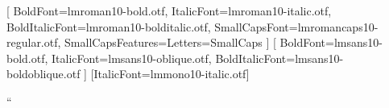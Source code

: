 
\usepackage{eurosym}
\usepackage{iftex}
\ifpdftex
  \usepackage[T1]{fontenc}
  \usepackage[utf8]{inputenc}
  \usepackage{lmodern}
\else
  \usepackage{fontspec}
  \setmainfont{lmroman10-regular.otf}[
    BoldFont=lmroman10-bold.otf,
    ItalicFont=lmroman10-italic.otf,
    BoldItalicFont=lmroman10-bolditalic.otf,
    SmallCapsFont=lmromancaps10-regular.otf,
    SmallCapsFeatures={Letters=SmallCaps}
  ]
  \setsansfont{lmsans10-regular.otf}[
    BoldFont=lmsans10-bold.otf,
    ItalicFont=lmsans10-oblique.otf,
    BoldItalicFont=lmsans10-boldoblique.otf
  ]
  \setmonofont{lmmono10-regular.otf}[ItalicFont=lmmono10-italic.otf]
\fi
\ifpdftex
  \usepackage{microtype}
\fi
\usepackage[catalan, provide=*]{babel}
\usepackage[autostyle=true,babel=true]{csquotes}
  {\guillemotleft}{\guillemotright}
  {\quotedblbase}{\textquotedblleft}
\usepackage{amsmath,mathtools}%
\usepackage{geometry}
\usepackage{import}
\usepackage{graphicx}
\usepackage{tabularx}
\usepackage{xltabular}%
\usepackage{tikz}
\usetikzlibrary{positioning,arrows.meta,matrix}
\usepackage[all]{xy}%
\usepackage{float}
\usepackage[section]{placeins}%
\usepackage{pgfplots}
\pgfplotsset{compat=1.18}
\usepackage{imakeidx}
\usepackage{booktabs}

